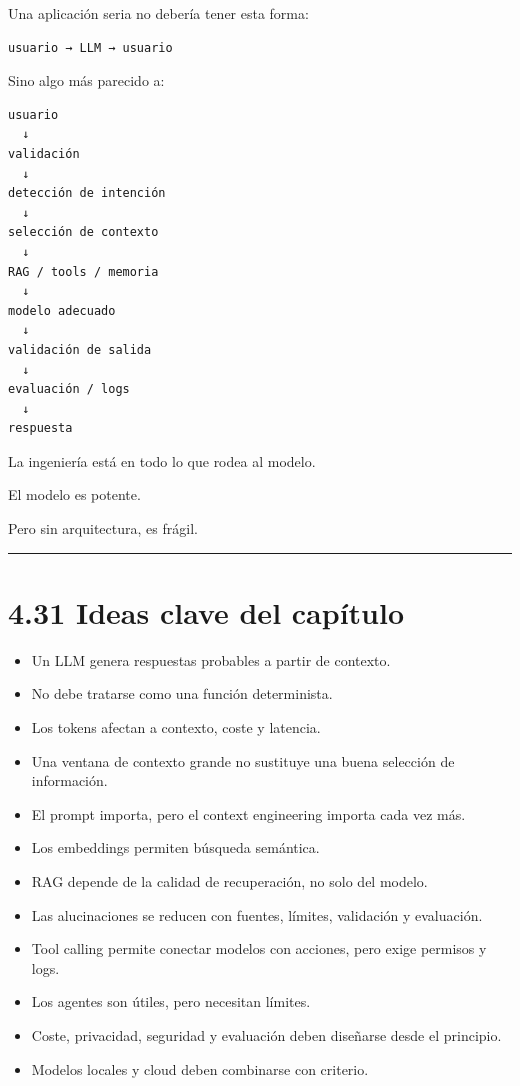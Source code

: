 Una aplicación seria no debería tener esta forma:

\begin{lstlisting}
usuario → LLM → usuario
\end{lstlisting}

Sino algo más parecido a:

\begin{lstlisting}
usuario
  ↓
validación
  ↓
detección de intención
  ↓
selección de contexto
  ↓
RAG / tools / memoria
  ↓
modelo adecuado
  ↓
validación de salida
  ↓
evaluación / logs
  ↓
respuesta
\end{lstlisting}

La ingeniería está en todo lo que rodea al modelo.

El modelo es potente.

Pero sin arquitectura, es frágil.

\begin{center}\rule{0.5\linewidth}{0.5pt}\end{center}

\section{4.31 Ideas clave del
capítulo}\label{ideas-clave-del-capuxedtulo-3}

\begin{itemize}
\tightlist
\item
  Un LLM genera respuestas probables a partir de contexto.
\item
  No debe tratarse como una función determinista.
\item
  Los tokens afectan a contexto, coste y latencia.
\item
  Una ventana de contexto grande no sustituye una buena selección de
  información.
\item
  El prompt importa, pero el context engineering importa cada vez más.
\item
  Los embeddings permiten búsqueda semántica.
\item
  RAG depende de la calidad de recuperación, no solo del modelo.
\item
  Las alucinaciones se reducen con fuentes, límites, validación y
  evaluación.
\item
  Tool calling permite conectar modelos con acciones, pero exige
  permisos y logs.
\item
  Los agentes son útiles, pero necesitan límites.
\item
  Coste, privacidad, seguridad y evaluación deben diseñarse desde el
  principio.
\item
  Modelos locales y cloud deben combinarse con criterio.
\end{itemize}

